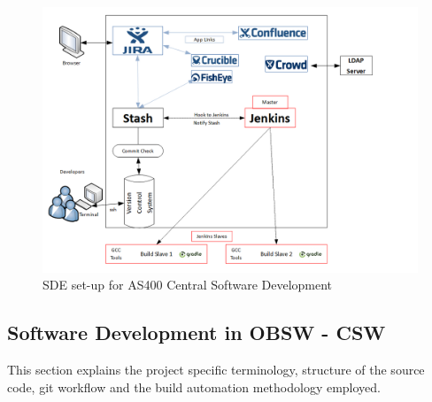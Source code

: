 \documentclass[12pt, a4paper, titlepage]{scrartcl}
\begin{document}
\begin{figure}[!ht]
\centering
\caption{SDE set-up for AS400 Central Software Development}
\label{fig:sde-chart}
\includegraphics[width=\textwidth,height=\textheight,keepaspectratio]{SDE-Chart.png}
\end{figure}

\subsection{Software Development in OBSW - CSW}
This section explains the project specific terminology, structure of the source code, git workflow and the build automation methodology employed.
\end{document}

